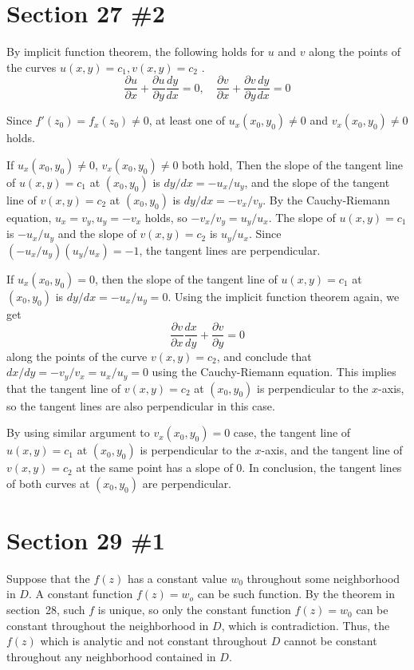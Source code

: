 \documentclass{scrartcl}
\begin{document}
\section{Section 27 \#2}
By implicit function theorem, the following holds for \(u\) and \(v\) along the points of the curves \(u(x, y) = c_1, v(x, y) = c_2\) .
\[
  \frac{\partial u}{\partial x} + \frac{\partial u}{\partial y} \frac{dy}{dx} = 0, \quad \frac{\partial v}{\partial x} + \frac{\partial v}{\partial y} \frac{dy}{dx} = 0
\]

Since \(f'(z_0) = f_x(z_0) \not = 0\), at least one of \(u_x(x_0, y_0) \not = 0\) and \(v_x(x_0, y_0) \not = 0\) holds.

If \(u_x(x_0, y_0) \not = 0\), \(v_x(x_0, y_0) \not = 0\) both hold, Then the slope of the tangent line of \(u(x, y) = c_1\) at \((x_0, y_0)\) is \(dy/dx = -u_x / u_y\), and the slope of the tangent line of \(v(x, y) = c_2\) at \((x_0, y_0)\) is \(dy/dx = -v_x / v_y\).
By the Cauchy-Riemann equation, \(u_x = v_y, u_y = -v_x\) holds, so \(-v_x / v_y = u_y / u_x\).
The slope of \(u(x, y) = c_1\) is \(-u_x / u_y\) and the slope of \(v(x, y) = c_2\) is \(u_y / u_x\).
Since \((-u_x / u_y)(u_y / u_x) = -1\), the tangent lines are perpendicular.

If \(u_x(x_0, y_0) = 0\), then the slope of the tangent line of \(u(x, y) = c_1\) at \((x_0, y_0)\) is \(dy/dx = -u_x / u_y = 0\).
Using the implicit function theorem again, we get
\[
  \frac{\partial v}{\partial x} \frac{dx}{dy} + \frac{\partial v}{\partial y} = 0
\]
along the points of the curve \(v(x, y) = c_2\), and conclude that \(dx/dy = -v_y / v_x = u_x / u_y = 0\) using the Cauchy-Riemann equation.
This implies that the tangent line of \(v(x, y) = c_2\) at \((x_0, y_0)\) is perpendicular to the \(x\)-axis, so the tangent lines are also perpendicular in this case.

By using similar argument to \(v_x(x_0, y_0) = 0\) case, the tangent line of \(u(x, y) = c_1\) at \((x_0, y_0)\) is perpendicular to the \(x\)-axis, and the tangent line of \(v(x, y) = c_2\) at the same point has a slope of 0.
In conclusion, the tangent lines of both curves at \((x_0, y_0)\) are perpendicular.


\section{Section 29 \#1}
Suppose that the \(f(z)\) has a constant value \(w_0\) throughout some neighborhood in \(D\).
A constant function \(f(z) = w_o\) can be such function.
By the theorem in section~28, such \(f\) is unique, so only the constant function \(f(z) = w_0\) can be constant throughout the neighborhood in \(D\), which is contradiction.
Thus, the \(f(z)\) which is analytic and not constant throughout \(D\) cannot be constant throughout any neighborhood contained in \(D\).
\end{document}
